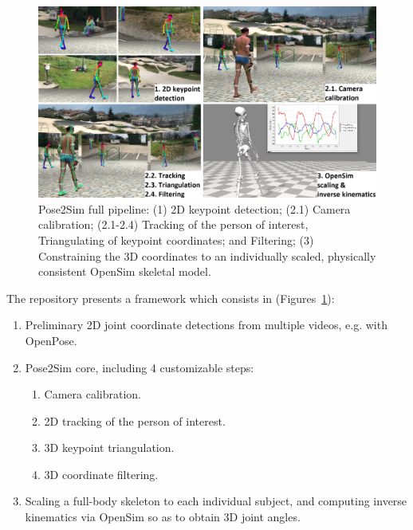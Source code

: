 \begin{figure}[hbtp]
	\centering
	\def\svgwidth{1\columnwidth}
	\fontsize{10pt}{10pt}\selectfont
	\includegraphics[width=\linewidth]{"../Chap3/Figures/Fig_Pipeline.png"}
	\caption{Pose2Sim full pipeline: (1) 2D keypoint detection; (2.1) Camera calibration; \newline(2.1-2.4) Tracking of the person of interest, Triangulating of keypoint coordinates; and Filtering; (3) Constraining the 3D coordinates to an individually scaled, physically consistent OpenSim skeletal model.}
	\label{fig_pipeline}
\end{figure}

\newpage

The repository presents a framework which consists in (Figures~\ref{fig_pipeline}):
\begin{enumerate}[itemsep=0em, topsep=0em, leftmargin=*]
      \item Preliminary 2D joint coordinate detections from multiple videos, e.g. with OpenPose.
      \item Pose2Sim core, including 4 customizable steps:
      \begin{enumerate}[before=\vspace{-0.5\baselineskip}, nosep, label*=\arabic*.]
            \item Camera calibration.
            \item 2D tracking of the person of interest.
            \item 3D keypoint triangulation.
            \item 3D coordinate filtering.
      \end{enumerate}
      \item Scaling a full-body skeleton to each individual subject, and computing inverse kinematics via OpenSim so as to obtain 3D joint angles.
\end{enumerate}

